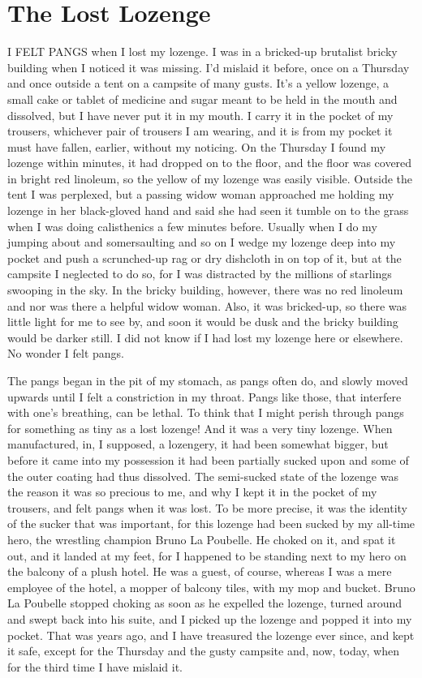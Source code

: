 \chapter{The Lost Lozenge}

I FELT PANGS when I lost my lozenge. I was in a bricked-up brutalist bricky building when I noticed it was missing. I'd mislaid it before, once on a Thursday and once outside a tent on a campsite of many gusts. It's a yellow lozenge, a small cake or tablet of medicine and sugar meant to be held in the mouth and dissolved, but I have never put it in my mouth. I carry it in the pocket of my trousers, whichever pair of trousers I am wearing, and it is from my pocket it must have fallen, earlier, without my noticing. On the Thursday I found my lozenge within minutes, it had dropped on to the floor, and the floor was covered in bright red linoleum, so the yellow of my lozenge was easily visible. Outside the tent I was perplexed, but a passing widow woman approached me holding my lozenge in her black-gloved hand and said she had seen it tumble on to the grass when I was doing calisthenics a few minutes before. Usually when I do my jumping about and somersaulting and so on I wedge my lozenge deep into my pocket and push a scrunched-up rag or dry dishcloth in on top of it, but at the campsite I neglected to do so, for I was distracted by the millions of starlings swooping in the sky. In the bricky building, however, there was no red linoleum and nor was there a helpful widow woman. Also, it was bricked-up, so there was little light for me to see by, and soon it would be dusk and the bricky building would be darker still. I did not know if I had lost my lozenge here or elsewhere. No wonder I felt pangs.

The pangs began in the pit of my stomach, as pangs often do, and slowly moved upwards until I felt a constriction in my throat. Pangs like those, that interfere with one's breathing, can be lethal. To think that I might perish through pangs for something as tiny as a lost lozenge! And it was a very tiny lozenge. When manufactured, in, I supposed, a lozengery, it had been somewhat bigger, but before it came into my possession it had been partially sucked upon and some of the outer coating had thus dissolved. The semi-sucked state of the lozenge was the reason it was so precious to me, and why I kept it in the pocket of my trousers, and felt pangs when it was lost. To be more precise, it was the identity of the sucker that was important, for this lozenge had been sucked by my all-time hero, the wrestling champion Bruno La Poubelle. He choked on it, and spat it out, and it landed at my feet, for I happened to be standing next to my hero on the balcony of a plush hotel. He was a guest, of course, whereas I was a mere employee of the hotel, a mopper of balcony tiles, with my mop and bucket. Bruno La Poubelle stopped choking as soon as he expelled the lozenge, turned around and swept back into his suite, and I picked up the lozenge and popped it into my pocket. That was years ago, and I have treasured the lozenge ever since, and kept it safe, except for the Thursday and the gusty campsite and, now, today, when for the third time I have mislaid it.

